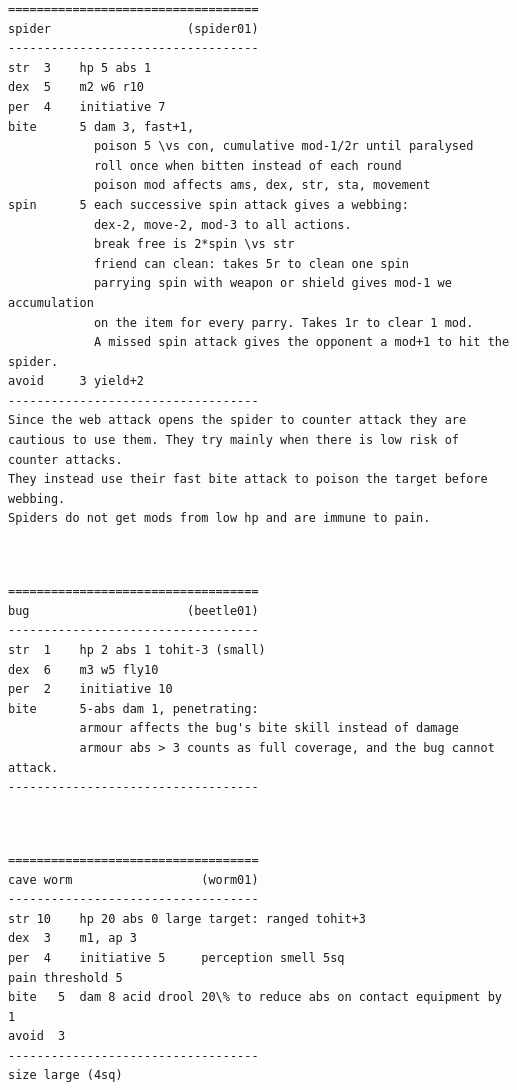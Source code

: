 \documentclass[11pt, twoside, titlepage, a4paper]{report}
\newcommand{\vs}{$\backslash\ $}  %
\begin{document}
\begin{verbatim}
\end{verbatim} \goodbreak \begin{verbatim}
===================================
spider                   (spider01)
-----------------------------------
str  3    hp 5 abs 1
dex  5    m2 w6 r10
per  4    initiative 7
bite      5 dam 3, fast+1,
            poison 5 \vs con, cumulative mod-1/2r until paralysed
            roll once when bitten instead of each round
            poison mod affects ams, dex, str, sta, movement
spin      5 each successive spin attack gives a webbing:
            dex-2, move-2, mod-3 to all actions.
            break free is 2*spin \vs str
            friend can clean: takes 5r to clean one spin
            parrying spin with weapon or shield gives mod-1 we accumulation
            on the item for every parry. Takes 1r to clear 1 mod.
            A missed spin attack gives the opponent a mod+1 to hit the spider.
avoid     3 yield+2
-----------------------------------
Since the web attack opens the spider to counter attack they are cautious to use them. They try mainly when there is low risk of counter attacks.
They instead use their fast bite attack to poison the target before webbing.
Spiders do not get mods from low hp and are immune to pain.



\end{verbatim} \goodbreak \begin{verbatim}
===================================
bug                      (beetle01)
-----------------------------------
str  1    hp 2 abs 1 tohit-3 (small)
dex  6    m3 w5 fly10
per  2    initiative 10
bite      5-abs dam 1, penetrating:
          armour affects the bug's bite skill instead of damage
          armour abs > 3 counts as full coverage, and the bug cannot attack.
-----------------------------------



\end{verbatim} \goodbreak \begin{verbatim}
===================================
cave worm                  (worm01)
-----------------------------------
str 10    hp 20 abs 0 large target: ranged tohit+3
dex  3    m1, ap 3
per  4    initiative 5     perception smell 5sq
pain threshold 5
bite   5  dam 8 acid drool 20\% to reduce abs on contact equipment by 1
avoid  3
-----------------------------------
size large (4sq)
\end{verbatim}\normalsize
\end{document}
